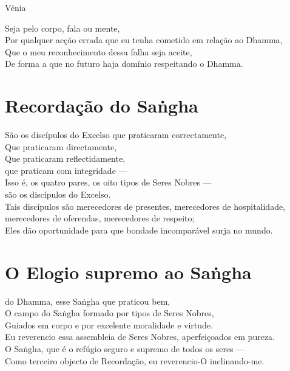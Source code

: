 \clearpage

\begin{instruction}
  Vénia
\end{instruction}

Seja pelo corpo, fala ou mente,\\
Por qualquer acção errada que eu tenha cometido em relação ao Dhamma,\\
Que o meu reconhecimento dessa falha seja aceite,\\
De forma a que no futuro haja domínio respeitando o Dhamma.

\chapter{Recordação do Saṅgha}

\begin{leader}
\end{leader}

São os discípulos do Excelso que praticaram correctamente,\\
Que praticaram directamente,\\
Que praticaram reflectidamente,\\
 que praticam com integridade ---\\
Isso é, os quatro pares, os oito tipos de Seres Nobres ---\\
 são os discípulos do Excelso.\\
Tais discípulos são merecedores de presentes, merecedores de hospitalidade,\\
\vin merecedores de oferendas, merecedores de respeito;\\
Eles dão oportunidade para que bondade incomparável surja no mundo.

\nextChapterUseDelegatedPageNumber

\chapter{O Elogio supremo ao Saṅgha}

\begin{leader}
\end{leader}

 do Dhamma, esse Saṅgha que praticou bem,\\
O campo do Saṅgha formado por  tipos de Seres Nobres,\\
Guiados em corpo e  por excelente moralidade e virtude.\\
Eu reverencio essa assembleia de Seres Nobres, aperfeiçoados em pureza.\\
O Saṅgha, que é o refúgio seguro e supremo de todos os seres ---\\
Como terceiro objecto de Recordação, eu reverencio-O inclinando-me.

